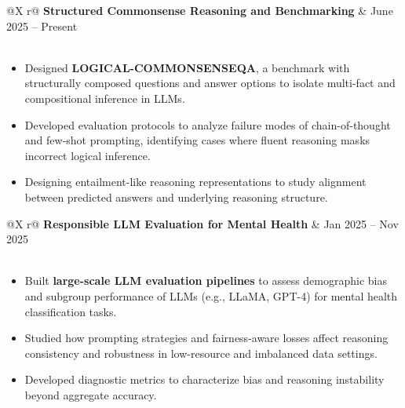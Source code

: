 \documentclass[a4paper,11pt]{article}
\begin{document}
\begin{tabularx}{\linewidth}{@{}X r@{}}
\textbf{Structured Commonsense Reasoning and Benchmarking} & June 2025 – Present \\
 \\
\end{tabularx}
\begin{itemize}[nosep, after=\strut, leftmargin=1.5em, itemsep=2pt]
    \item Designed \textbf{LOGICAL-COMMONSENSEQA}, a benchmark with structurally composed questions and answer options to isolate multi-fact and compositional inference in LLMs.
    \item Developed evaluation protocols to analyze failure modes of chain-of-thought and few-shot prompting, identifying cases where fluent reasoning masks incorrect logical inference.
    \item Designing entailment-like reasoning representations to study alignment between predicted answers and underlying reasoning structure.
\end{itemize}

\begin{tabularx}{\linewidth}{@{}X r@{}}
\textbf{Responsible LLM Evaluation for Mental Health} & Jan 2025 – Nov 2025 \\
 \\
\end{tabularx}
\begin{itemize}[nosep, after=\strut, leftmargin=1.5em, itemsep=2pt]
    \item Built \textbf{large-scale LLM evaluation pipelines} to assess demographic bias and subgroup performance of LLMs (e.g., LLaMA, GPT-4) for mental health classification tasks.
    \item Studied how prompting strategies and fairness-aware losses affect reasoning consistency and robustness in low-resource and imbalanced data settings.
    \item Developed diagnostic metrics to characterize bias and reasoning instability beyond aggregate accuracy.
\end{itemize}
\end{document}
